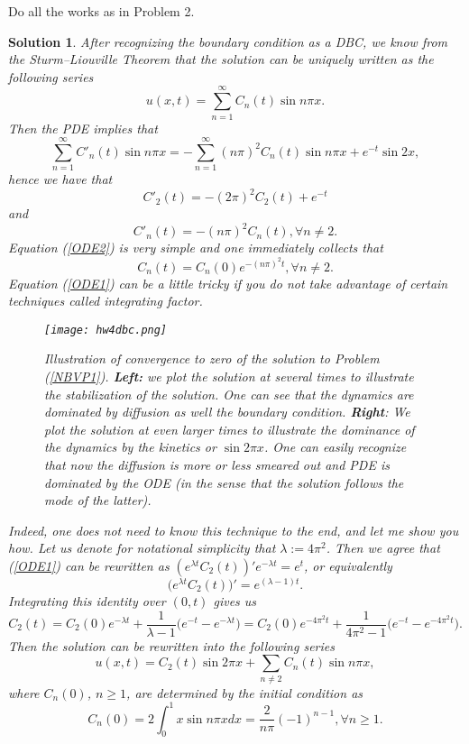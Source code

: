 \documentclass[6pt]{article}
\newtheorem{solution}{Solution}
\numberwithin{equation}{section}
\begin{document}
\begin{enumerate}
Do all the works as in Problem 2.
\begin{solution}
After recognizing the boundary condition as a DBC, we know from the Sturm--Liouville Theorem that the solution can be uniquely written as the following series
\[u(x,t)=\sum_{n=1}^\infty C_n(t)\sin n\pi x.\]
Then the PDE implies that
\[\sum_{n=1}^\infty C'_n(t)\sin n\pi x=-\sum_{n=1}^\infty(n\pi)^2C_n(t)\sin n\pi x+e^{-t}\sin 2x,\]
hence we have that
\begin{equation}\label{ODE1}
C'_2(t)=-(2\pi)^2C_2(t)+e^{-t}
\end{equation}
and
\begin{equation}\label{ODE2}
C'_n(t)=-(n\pi)^2C_n(t), \forall n\neq 2.
\end{equation}
Equation (\ref{ODE2}) is very simple and one immediately collects that
\[C_n(t)=C_n(0)e^{-(n\pi)^2t}, \forall n\neq 2.\]
Equation (\ref{ODE1}) can be a little tricky if you do not take advantage of certain techniques called integrating factor.
\begin{figure}
  \centering
  \texttt{[image: hw4dbc.png]}\\
  \caption{Illustration of convergence to zero of the solution to Problem (\ref{NBVP1}).  \textbf{Left:} we plot the solution at several times to illustrate the stabilization of the solution.  One can see that the dynamics are dominated by diffusion as well the boundary condition.  \textbf{Right}:  We plot the solution at even larger times to illustrate the dominance of the dynamics by the kinetics or $\sin 2\pi x$.  One can easily recognize that now the diffusion is more or less smeared out and PDE is dominated by the ODE (in the sense that the solution follows the mode of the latter).}\label{ }
\end{figure}

Indeed, one does not need to know this technique to the end, and let me show you how.  Let us denote for notational simplicity that $\lambda:=4\pi^2$.   Then we agree that (\ref{ODE1}) can be rewritten as $(e^{\lambda t}C_2(t))'e^{-\lambda t}=e^{t}$, or equivalently
\[\big(e^{\lambda t}C_2(t)\big)'=e^{(\lambda -1)t}.\]
Integrating this identity over $(0,t)$ gives us
\[C_2(t)=C_2(0)e^{-\lambda t}+\frac{1}{\lambda -1}\Big(e^{-t}-e^{-\lambda t}\Big)=C_2(0)e^{-4\pi^2 t}+\frac{1}{4\pi^2 -1}\Big(e^{-t}-e^{-4\pi^2 t}\Big).\]
Then the solution can be rewritten into the following series 
\[u(x,t)=C_2(t)\sin 2\pi x+\sum_{n\neq2}C_n(t)\sin n\pi x,\]
where $C_n(0)$, $n\geq1$, are determined by the initial condition as
\[C_n(0)=2\int_0^1 x\sin n\pi xdx=\frac{2}{n\pi}(-1)^{n-1}, \forall n\geq1.\]
\end{solution}



\end{enumerate}
\end{document}
